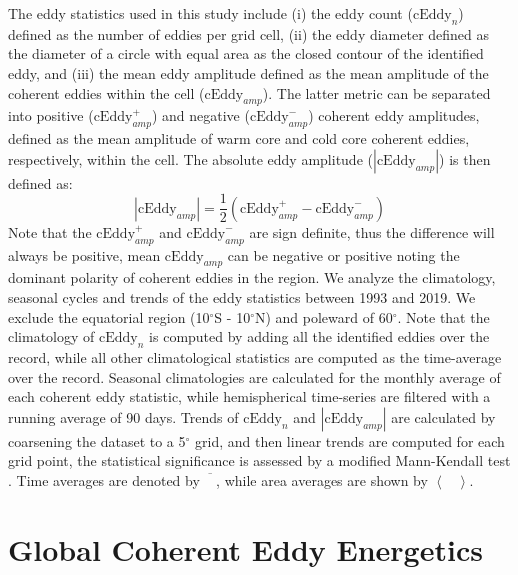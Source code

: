 \documentclass[draft,linenumbers]{agujournal2019}
\begin{document}
	The eddy statistics used in this study include (i) the eddy count ($\mathrm{cEddy}_{n}$) defined as the number of eddies per grid cell, (ii) the eddy diameter defined as the diameter of a circle with equal area as the closed contour of the identified eddy, and (iii) the mean eddy amplitude defined as the mean amplitude of the coherent eddies within the cell ($\mathrm{cEddy}_{amp}$). The latter metric can be separated into positive ($\mathrm{cEddy}_{amp}^{+}$) and negative ($\mathrm{cEddy}_{amp}^{-}$) coherent eddy amplitudes, defined as the mean amplitude of warm core and cold core coherent eddies, respectively, within the cell. 
	The absolute eddy amplitude ($|\mathrm{cEddy}_{amp}|$) is then defined as:
	\begin{equation}
	|\mathrm{cEddy}_{amp}| = \frac{1}{2} \left(\mathrm{cEddy}_{amp}^{+} -  \mathrm{cEddy}_{amp}^{-} \right)
	\end{equation}
	Note that the $\mathrm{cEddy}_{amp}^{+}$ and $\mathrm{cEddy}_{amp}^{-}$ are sign definite, thus the difference will always be positive, mean $\mathrm{cEddy}_{amp}$ can be negative or positive noting the dominant polarity of coherent eddies in the region. We analyze the climatology, seasonal cycles and trends of the eddy statistics between 1993 and 2019. We exclude the equatorial region (10$^\circ$S - 10$^\circ$N) and poleward of 60$^\circ$. Note that the climatology of $\mathrm{cEddy}_{n}$ is computed by adding all the identified eddies over the record, while all other climatological statistics are computed as the time-average over the record.  Seasonal climatologies are calculated for the monthly average of each coherent eddy statistic, while hemispherical time-series are filtered with a running average of 90 days. Trends of $\mathrm{cEddy}_{n}$ and $|\mathrm{cEddy}_{amp}|$ are calculated by coarsening the dataset to a 5$^\circ$ grid, and then linear trends are computed for each grid point, the statistical significance is assessed by a modified Mann-Kendall test \citep{Sheng_MK_2004}. Time averages are denoted by $\overline{\phantom{X}}$, while area averages are shown by $\left< \phantom{X}\right>$.

	\section{Global Coherent Eddy Energetics}
	\label{sec:CEKE_climatology}

\end{document}
